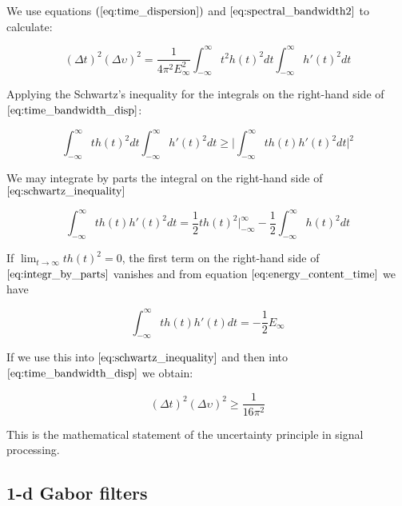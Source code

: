 We use equations $(\eqref{eq:time_dispersion})$ and $\eqref{eq:spectral_bandwidth2}$ to calculate:

\begin{equation}\label{eq:time_bandwidth_disp}
    (\Delta t)^2(\Delta \upsilon)^2 = \frac{1}{4 \pi^{2} E_{\infty}^{2}} \int_{-\infty}^{\infty} t^2h(t)^2 dt \int_{-\infty}^{\infty}h'(t)^2 dt
\end{equation}

Applying the Schwartz's inequality for the integrals on the right-hand side of $\eqref{eq:time_bandwidth_disp}$:

\begin{equation}\label{eq:schwartz_inequality}
    \int_{-\infty}^{\infty}t h(t)^2 dt \int_{-\infty}^{\infty}h'(t)^2 dt  \geq \biggr\rvert \int_{-\infty}^{\infty}t h(t)h'(t)^2 dt \biggr\rvert^{2}
\end{equation}

We may integrate by parts the integral on the right-hand side of $\eqref{eq:schwartz_inequality}$

\begin{equation}\label{eq:integr_by_parts}
    \int_{-\infty}^{\infty}t h(t) h'(t)^2 dt =  \frac{1}{2}t h(t)^2 \biggr\rvert_{-\infty}^{\infty} - \frac{1}{2} \int_{-\infty}^{\infty}h(t)^2 dt
\end{equation}

If $\lim_{t\rightarrow \infty} t h(t)^2=0$, the first term on the right-hand side of $\eqref{eq:integr_by_parts}$ vanishes and from equation $\eqref{eq:energy_content_time}$ we have

\begin{equation}\label{eq:energy_content_developped}
    \int_{-\infty}^{\infty} t h(t)h'(t) dt = -\frac{1}{2} E_{\infty}
\end{equation}

If we use this into $\eqref{eq:schwartz_inequality}$ and then into $\eqref{eq:time_bandwidth_disp}$ we obtain:

\begin{equation}\label{eq:uncertainty_principle_freq_square}
   (\Delta t)^2(\Delta \upsilon)^2 \geq \frac{1}{16\pi^{2}} 
\end{equation}

This is the mathematical statement of the uncertainty principle in signal processing.

\subsection{1-d Gabor filters}

